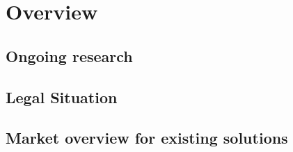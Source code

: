 \documentclass[ExampleMasters.tex]{subfiles}
\begin{document}
\clearpage
\chapter{Overview}
\section{Ongoing research}
\section{Legal Situation}
\section{Market overview for existing solutions}
\end{document}
